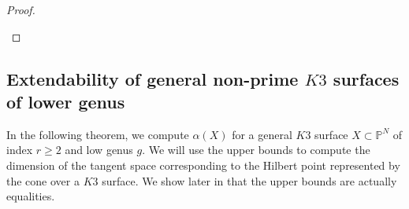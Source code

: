 \documentclass[11pt,twoside]{amsart}
\theoremstyle{plain}
\numberwithin{equation}{section}
\theoremstyle{definition}
\begin{document}
\begin{proof}
\begin{enumerate}

        
        
    \end{enumerate}
\end{proof}


\subsection{Extendability of general non-prime $K3$ surfaces of lower genus}

In the following theorem, we compute $\alpha(X)$ for a general $K3$ surface $X \subset \mathbb{P}^N$ of index $r \geq 2$ and low genus $g$. We will use the upper bounds to compute the dimension of the tangent space corresponding to the Hilbert point represented by the cone over a $K3$ surface. We show later in  that the upper bounds are actually equalities. 
\end{document}
